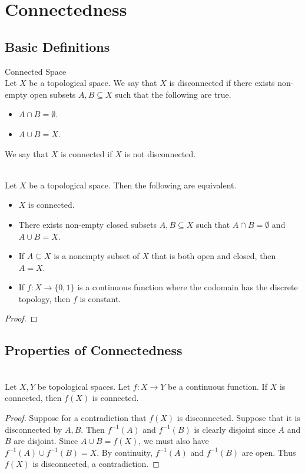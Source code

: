 \documentclass[a4paper]{article}
\begin{document}
\pagebreak
\section{Connectedness}
\subsection{Basic Definitions}
\begin{defn}{Connected Space}{}\\
Let $X$ be a topological space. We say that $X$ is disconnected if there exists non-empty open subsets $A,B\subseteq X$ such that the following are true. 
\begin{itemize}
\item $A\cap B=\emptyset$. 
\item $A\cup B=X$. 
\end{itemize}
We say that $X$ is connected if $X$ is not disconnected. 
\end{defn}

\begin{prp}{}{}\\
Let $X$ be a topological space. Then the following are equivalent. 
\begin{itemize}
\item $X$ is connected. 
\item There exists non-empty closed subsets $A,B\subseteq X$ such that $A\cap B=\emptyset$ and $A\cup B=X$. 
\item If $A\subseteq X$ is a nonempty subset of $X$ that is both open and closed, then $A=X$. 
\item If $f:X\to\{0,1\}$ is a continuous function where the codomain has the discrete topology, then $f$ is constant. 
\end{itemize}
\begin{proof}
\end{proof}
\end{prp}

\subsection{Properties of Connectedness}
\begin{prp}{}{}\\
Let $X,Y$ be topological spaces. Let $f:X\to Y$ be a continuous function. If $X$ is connected, then $f(X)$ is connected. 
\begin{proof}
Suppose for a contradiction that $f(X)$ is disconnected. Suppose that it is disconnected by $A,B$. Then $f^{-1}(A)$ and $f^{-1}(B)$ is clearly disjoint since $A$ and $B$ are disjoint. Since $A\cup B=f(X)$, we must also have $f^{-1}(A)\cup f^{-1}(B)=X$. By continuity, $f^{-1}(A)$ and $f^{-1}(B)$ are open. Thus $f(X)$ is disconnected, a contradiction. 
\end{proof}
\end{prp}
\end{document}
